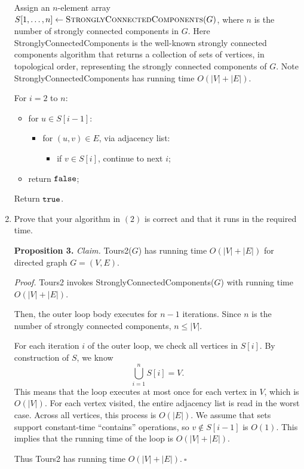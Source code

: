 \begin{enumerate}
\begin{solution}
Assign an $n$-element array $S[1,\dots,n]\leftarrow\textsc{StronglyConnectedComponents}(G)$, where $n$ is the number of strongly connected components in $G$. Here {\sc StronglyConnectedComponents} is the well-known strongly connected components algorithm that returns a collection of sets of vertices, in topological order, representing the strongly connected components of $G$. Note {\sc StronglyConnectedComponents} has running time $O(|V|+|E|)$.

For $i=2$ to $n$:
\begin{itemize}
    \item for $u\in S[i-1]$:
    \begin{itemize}
        \item for $(u,v)\in E$, via adjacency list:
        \begin{itemize}
            \item if $v\in S[i]$, continue to next $i$;
        \end{itemize}
    \end{itemize}
    \item return $\verb|false|$;
\end{itemize}
Return $\verb|true|$.
\end{solution}
\item Prove that your algorithm in $(2)$ is correct and that it runs in the required time.
\begin{solution}

\textbf{Proposition 3. }\textit{Claim. }{\sc Tours2}($G$) has running time $O(|V|+|E|)$ for directed graph $G=(V,E)$.

\textit{Proof. }{\sc Tours2} invokes {\sc StronglyConnectedComponents}($G$) with running time $O(|V|+|E|)$.

Then, the outer loop body executes for $n-1$ iterations. Since $n$ is the number of strongly connected components, $n\leq|V|$.

For each iteration $i$ of the outer loop, we check all vertices in $S[i]$. By construction of $S$, we know \[\bigcup_{i=1}^{n}S[i]=V.\] This means that the loop executes at most once for each vertex in $V$, which is $O(|V|)$. For each vertex visited, the entire adjacency list is read in the worst case. Across all vertices, this process is $O(|E|)$. We assume that sets support constant-time  ``contains'' operations, so $v\notin S[i-1]$ is $O(1)$. This implies that the running time of the loop is $O(|V|+|E|)$.

Thus {\sc Tours2} has running time $O(|V|+|E|).~\square$


\end{solution}
\end{enumerate}
